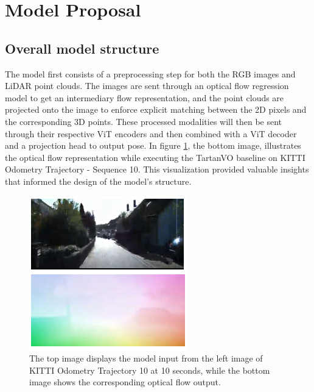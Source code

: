 \documentclass[11pt,a4paper]{article}
\begin{document}
\section{Model Proposal}

\subsection{Overall model structure}
The model first consists of a preprocessing step for both the RGB images and LiDAR point clouds. The images are sent through an optical flow regression model to get an intermediary flow representation, and the point clouds are projected onto the image to enforce explicit matching between the 2D pixels and the corresponding 3D points. These processed modalities will then be sent through their respective ViT encoders and then combined with a ViT decoder and a projection head to output pose. In figure \ref{fig:tartanvo-opticalflow}, the bottom image, illustrates the optical flow representation while executing the TartanVO baseline on KITTI Odometry Trajectory - Sequence 10. This visualization provided valuable insights that informed the design of the model's structure. 

\begin{figure}[t]
    \centering
    \includegraphics[width=1.0\linewidth]{Reports/2-Baselines-and-Model-Proposal/images/kitti10--inp_flow_10sec.png}
    \caption{The top image displays the model input from the left image of KITTI Odometry Trajectory 10 at 10 seconds, while the bottom image shows the corresponding optical flow output.}
    \label{fig:tartanvo-opticalflow}
\end{figure}
\end{document}
